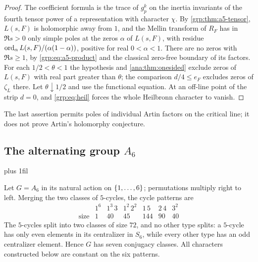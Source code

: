 \begin{proof}
The coefficient formula is the trace of $g_p^k$ on the inertia invariants of
the fourth tensor power of a representation with character $\chi$. By \cref{grp:thm:a5-tensor}, $L(s,F)$ is holomorphic
away from $1$, and the Mellin transform of $R_F$ has in $\Re s>0$ only simple
poles at the zeros $\alpha$ of $L(s,F)$, with residue
$\operatorname{ord}_\alpha L(s,F)/(\alpha(1-\alpha))$, positive for real $0<\alpha<1$. There
are no zeros with $\Re s\ge1$, by \eqref{grp:eq:a5-product} and the classical
zero-free boundary of its factors. For each $1/2<\theta<1$ the hypothesis and
\cref{ana:thm:onesided} exclude zeros of $L(s,F)$ with real part greater than
$\theta$; the comparison $d/4\le e_F$ excludes zeros of $\zeta_L$ there. Let
$\theta\downarrow1/2$ and use the functional equation. At an off-line point of
the strip $d=0$, and \eqref{grp:eq:heil} forces the whole Heilbronn character
to vanish.
\end{proof}

The last assertion permits poles of individual Artin factors on the critical
line; it does not prove Artin's holomorphy conjecture.

\subsection{The alternating group \texorpdfstring{$A_6$}{A6}}\label{grp:sec:a6}
{\rightskip=0pt plus 1fil\relax
{}
}

Let $G=A_6$ in its natural action on $\{1,\dots,6\}$; permutations multiply
right to left. Merging the two classes of $5$-cycles, the cycle patterns are
\[
\begin{array}{c|rrrrrr}
 &1^6&1^3\,3&1^2\,2^2&1\,5&2\,4&3^2\\\hline
 \text{size}&1&40&45&144&90&40
\end{array}
\]
The $5$-cycles split into two classes of size $72$, and no other type splits:
a $5$-cycle has only even elements in its centralizer in $S_6$, while every
other type has an odd centralizer element. Hence $G$ has seven conjugacy
classes. All characters constructed below are constant on the six patterns.

